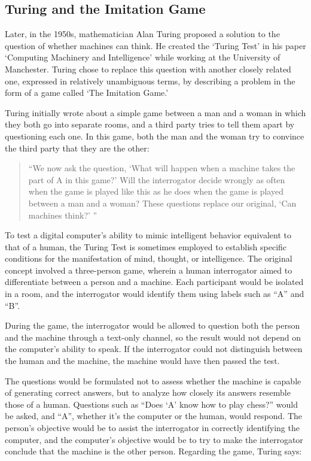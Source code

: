 \documentclass{article}
\begin{document}
\subsection{Turing and the Imitation Game}
Later, in the 1950s, mathematician Alan Turing proposed a solution to the question of whether machines can think. He created the `Turing Test' in his paper `Computing Machinery and Intelligence' while working at the University of Manchester. Turing chose to replace this question with another closely related one, expressed in relatively unambiguous terms, by describing a problem in the form of a game called `The Imitation Game.' 
\par
Turing initially wrote about a simple game between a man and a woman in which they both go into separate rooms, and a third party tries to tell them apart by questioning each one. In this game, both the man and the woman try to convince the third party that they are the other: 
\par
\begin{quote}
``We now ask the question, `What will happen when a machine takes the part of A in this game?' Will the interrogator decide wrongly as often when the game is played like this as he does when the game is played between a man and a woman? These questions replace our original, `Can machines think?' '' 
\end{quote}
\par
To test a digital computer's ability to mimic intelligent behavior equivalent to that of a human, the Turing Test is sometimes employed to establish specific conditions for the manifestation of mind, thought, or intelligence. The original concept involved a three-person game, wherein a human interrogator aimed to differentiate between a person and a machine. Each participant would be isolated in a room, and the interrogator would identify them using labels such as ``A'' and ``B''. 
\par
During the game, the interrogator would be allowed to question both the person and the machine through a text-only channel, so the result would not depend on the computer's ability to speak. If the interrogator could not distinguish between the human and the machine, the machine would have then passed the test. 
\par
The questions would be formulated not to assess whether the machine is capable of generating correct answers, but to analyze how closely its answers resemble those of a human. Questions such as ``Does `A' know how to play chess?'' would be asked, and ``A'', whether it's the computer or the human, would respond. The person's objective would be to assist the interrogator in correctly identifying the computer, and the computer's objective would be to try to make the interrogator conclude that the machine is the other person. Regarding the game, Turing says: 
\end{document}
